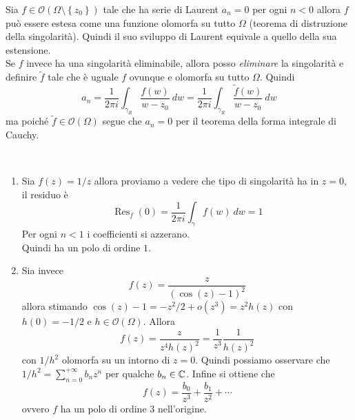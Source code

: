 \begin{remark}
  Sia $f \in \mathcal{O}(\Omega \setminus \left\{ z_0 \right\})$ tale che ha serie di 
  Laurent $a_n = 0$ per ogni $n < 0$  allora $f$ può essere estesa come una 
  funzione olomorfa su tutto $\Omega$ (teorema di distruzione della singolarità).
  Quindi il suo sviluppo di Laurent equivale a quello della sua estensione.\\
  
  Se $f$ invece ha una singolarità eliminabile, allora posso \emph{eliminare} la
  singolarità e definire $\tilde{f}$ tale che è uguale $f$ ovunque e olomorfa su
  tutto $\Omega$. Quindi 
  \begin{equation*}
    a_n = \frac{1}{2\pi i} \int_{\gamma_R} \frac{f(w)}{w-z_0}\ dw 
        = \frac{1}{2\pi i} \int_{\gamma_R} \frac{\tilde{f}(w)}{w-z_0}\ dw
  \end{equation*}
  ma poiché $\tilde{f} \in \mathcal{O}(\Omega)$ segue che $a_n = 0$ per il teorema
  della forma integrale di Cauchy.
  \label{rmk:equivalenza_definizioni_sing_eliminabili}
\end{remark}

\newpage

\begin{example}\
  \begin{enumerate}
    \item Sia $f(z) = 1/z$ allora proviamo a vedere che tipo di singolarità ha
      in $z = 0$, il residuo è 
      \begin{equation*}
        \operatorname{Res}_f(0) = \frac{1}{2\pi i } \int_{\gamma} f(w)\ dw = 1
      \end{equation*}
      Per ogni $n < 1$ i coefficienti si azzerano.\\ Quindi ha un polo di ordine
      $1$.
    \item Sia invece 
      \begin{equation*}
        f(z) = \frac{z}{(\cos(z) - 1)^2}
      \end{equation*}
      allora stimando $\cos(z) - 1 = -z^2/2 + o(z^3) = z^2 h(z)$ con $h(0)
      = -1/2$ e $h \in \mathcal{O}(\Omega)$. Allora 
      \begin{equation*}
        f(z) = \frac{z}{z^4h(z)^2} = \frac{1}{z^3} \frac{1}{h(z)^2}
      \end{equation*} 
      con $1/h^2$ olomorfa su un intorno di $z = 0$. Quindi possiamo osservare
      che $1/h^2 = \sum_{n=0}^{+\infty} b_n z^n$ per qualche $b_n \in \mathbb{C}$.
      Infine si ottiene che 
      \begin{equation*}
        f(z) = \frac{b_0}{z^3} + \frac{b_1}{z^2} + \cdots
      \end{equation*}
      ovvero $f$ ha un polo di ordine $3$ nell'origine.
  \end{enumerate}
\end{example}

